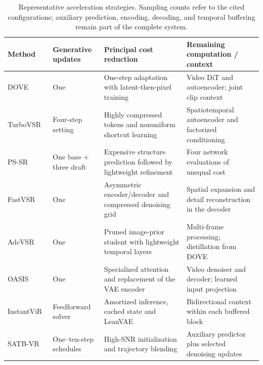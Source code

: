 \begin{table}[t]
\caption{Representative acceleration strategies. Sampling counts refer to the cited configurations; auxiliary prediction, encoding, decoding, and temporal buffering remain part of the complete system.}
\label{tab:efficiency}\centering\footnotesize
\begin{tabularx}{\textwidth}{@{}p{}p{}YY@{}}\toprule
Method & Generative updates & Principal cost reduction & Remaining computation / context \\\midrule
DOVE~\cite{dove} & One & One-step adaptation with latent-then-pixel training & Video DiT and autoencoder; joint clip context \\
TurboVSR~\cite{turbo} & Four-step setting & Highly compressed tokens and nonuniform shortcut learning & Spatiotemporal autoencoder and factorized conditioning \\
PS-SR~\cite{pssr} & One base + three draft & Expensive structure prediction followed by lightweight refinement & Four network evaluations of unequal cost \\
FastVSR~\cite{fastvsr} & One & Asymmetric encoder/decoder and compressed denoising grid & Spatial expansion and detail reconstruction in the decoder \\
AdcVSR~\cite{adcvsr} & One & Pruned image-prior student with lightweight temporal layers & Multi-frame processing; distillation from DOVE \\
OASIS~\cite{oasis} & One & Specialized attention and replacement of the VAE encoder & Video denoiser and decoder; learned input projection \\
InstantViR~\cite{instantvir} & Feedforward solver & Amortized inference, cached state and LeanVAE & Bidirectional context within each buffered block \\
SATB-VR~\cite{satbvr} & One--ten-step schedules & High-SNR initialization and trajectory blending & Auxiliary predictor plus selected denoising updates \\\bottomrule
\end{tabularx}
\end{table}

